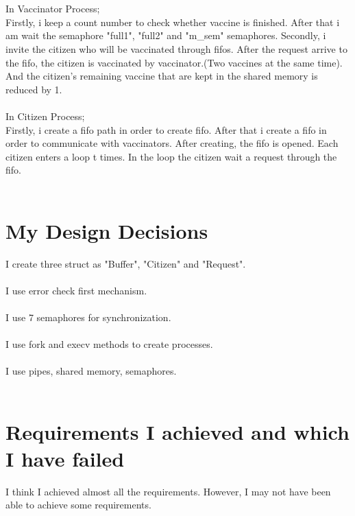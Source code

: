 \documentclass[20pt]{article}
\begin{document}
\\\\
In Vaccinator Process; \\
Firstly, i keep a count number to check whether vaccine is finished. After that i am wait the semaphore "full1", "full2" and "m\_sem" semaphores. Secondly, i invite the citizen who will be vaccinated through fifos. After the request arrive to the fifo, the citizen is vaccinated by vaccinator.(Two vaccines at the same time). And the citizen's remaining vaccine that are kept in the shared memory is reduced by 1.
\\\\
In Citizen Process; \\
Firstly, i create a fifo path in order to create fifo. After that i create a fifo in order to communicate with vaccinators. After creating, the fifo is opened. Each citizen enters a loop t times. In the loop the citizen wait a request through the fifo.
\\\\
\section{My Design Decisions}
I create three struct as "Buffer", "Citizen" and "Request". 
\\\\
I use error check first mechanism.
\\\\
I use 7 semaphores for synchronization.
\\\\
I use fork and execv methods to create processes.
\\\\
I use pipes, shared memory, semaphores.
\\\\
\section{Requirements I achieved and which I have failed}
I think I achieved almost all the requirements. However, I may not have been able to achieve some requirements.
\end{document}
